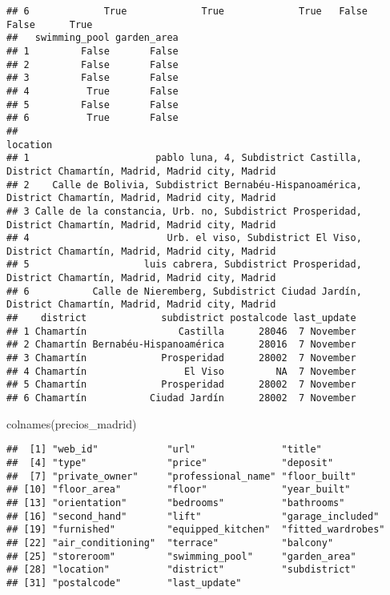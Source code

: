 \documentclass[
]{article}
\newenvironment{Shaded}{\begin{snugshade}}{\end{snugshade}}
\newcommand{\FunctionTok}[1]{\textcolor[rgb]{0.00,0.00,0.00}{#1}}
\newcommand{\NormalTok}[1]{#1}
\begin{document}
\begin{verbatim}
## 6             True             True             True   False   False      True
##   swimming_pool garden_area
## 1         False       False
## 2         False       False
## 3         False       False
## 4          True       False
## 5         False       False
## 6          True       False
##                                                                                                    location
## 1                      pablo luna, 4, Subdistrict Castilla, District Chamartín, Madrid, Madrid city, Madrid
## 2    Calle de Bolivia, Subdistrict Bernabéu-Hispanoamérica, District Chamartín, Madrid, Madrid city, Madrid
## 3 Calle de la constancia, Urb. no, Subdistrict Prosperidad, District Chamartín, Madrid, Madrid city, Madrid
## 4                        Urb. el viso, Subdistrict El Viso, District Chamartín, Madrid, Madrid city, Madrid
## 5                    luis cabrera, Subdistrict Prosperidad, District Chamartín, Madrid, Madrid city, Madrid
## 6           Calle de Nieremberg, Subdistrict Ciudad Jardín, District Chamartín, Madrid, Madrid city, Madrid
##    district             subdistrict postalcode last_update
## 1 Chamartín                Castilla      28046  7 November
## 2 Chamartín Bernabéu-Hispanoamérica      28016  7 November
## 3 Chamartín             Prosperidad      28002  7 November
## 4 Chamartín                 El Viso         NA  7 November
## 5 Chamartín             Prosperidad      28002  7 November
## 6 Chamartín           Ciudad Jardín      28002  7 November
\end{verbatim}

\begin{Shaded}
\begin{Highlighting}[]
\FunctionTok{colnames}\NormalTok{(precios\_madrid)}
\end{Highlighting}
\end{Shaded}

\begin{verbatim}
##  [1] "web_id"            "url"               "title"            
##  [4] "type"              "price"             "deposit"          
##  [7] "private_owner"     "professional_name" "floor_built"      
## [10] "floor_area"        "floor"             "year_built"       
## [13] "orientation"       "bedrooms"          "bathrooms"        
## [16] "second_hand"       "lift"              "garage_included"  
## [19] "furnished"         "equipped_kitchen"  "fitted_wardrobes" 
## [22] "air_conditioning"  "terrace"           "balcony"          
## [25] "storeroom"         "swimming_pool"     "garden_area"      
## [28] "location"          "district"          "subdistrict"      
## [31] "postalcode"        "last_update"
\end{verbatim}
\end{document}
